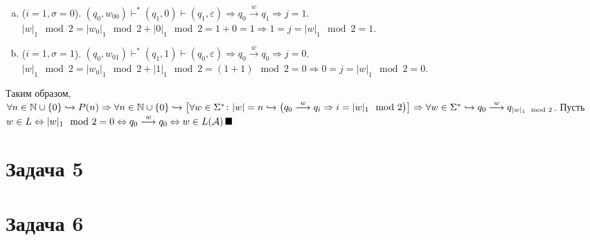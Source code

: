 \documentclass[a4paper]{article}
\def\A{{\cal A}}
\begin{document}
\begin{enumerate}
\begin{enumerate}
\begin{enumerate}[a.]
\item ($i=1,\sigma=0$). $(q_0,w_00)\vdash^*(q_1,0)\vdash(q_1,\varepsilon)\Rightarrow q_0\overset{w}{\longrightarrow}q_1\Rightarrow j=1$. $|w|_1\mod 2=|w_0|_1\mod 2+|0|_1\mod 2=1+0=1\Rightarrow 1=j=|w|_1\mod 2=1$.
\item ($i=1,\sigma=1$). $(q_0,w_01)\vdash^*(q_1,1)\vdash(q_0,\varepsilon)\Rightarrow q_0\overset{w}{\longrightarrow}q_0\Rightarrow j=0$. $|w|_1\mod 2=|w_0|_1\mod 2+|1|_1\mod 2=(1+1)\mod 2=0\Rightarrow 0=j=|w|_1\mod 2=0$.
\end{enumerate}
\end{enumerate}
Таким образом, $\forall n\in{\mathbb N}\cup\{0\}\hookrightarrow P(n)\Rightarrow \forall n\in{\mathbb N}\cup\{0\}\hookrightarrow \big[\forall w\in\Sigma^*\colon |w|=n\hookrightarrow \big(q_0\overset{w}{\longrightarrow}q_i\Rightarrow i=|w|_1\mod 2\big)\big]\Rightarrow\newline\forall w\in\Sigma^*\hookrightarrow q_0\overset{w}{\longrightarrow}q_{|w|_1\mod 2}$.
Пусть $w\in L\Leftrightarrow |w|_1\mod 2=0\Leftrightarrow q_0\overset{w}{\longrightarrow}q_0\Leftrightarrow w\in L(\A)\,\blacksquare$
\end{enumerate}
\section*{Задача 5}
\section*{Задача 6}
\end{document}
